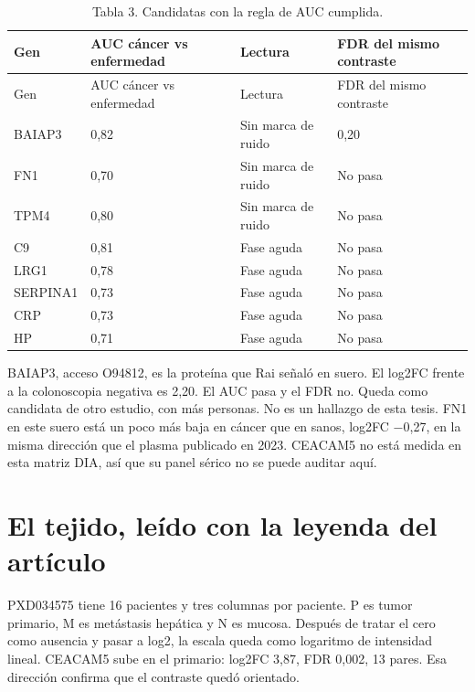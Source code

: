 \documentclass[12pt,oneside]{report}
\begin{document}
\begin{longtable}{p{3.88cm} p{3.88cm} p{3.88cm} p{3.88cm}}
\caption{Tabla 3. Candidatas con la regla de AUC cumplida.}\\
\toprule
Gen & AUC cáncer vs enfermedad & Lectura & FDR del mismo contraste\\
\midrule
\endfirsthead
\toprule
Gen & AUC cáncer vs enfermedad & Lectura & FDR del mismo contraste\\
\midrule
\endhead
BAIAP3 & 0,82 & Sin marca de ruido & 0,20\\
FN1 & 0,70 & Sin marca de ruido & No pasa\\
TPM4 & 0,80 & Sin marca de ruido & No pasa\\
C9 & 0,81 & Fase aguda & No pasa\\
LRG1 & 0,78 & Fase aguda & No pasa\\
SERPINA1 & 0,73 & Fase aguda & No pasa\\
CRP & 0,73 & Fase aguda & No pasa\\
HP & 0,71 & Fase aguda & No pasa\\
\bottomrule
\end{longtable}
BAIAP3, acceso O94812, es la proteína que Rai señaló en suero. El log2FC frente a la colonoscopia negativa es 2,20. El AUC pasa y el FDR no. Queda como candidata de otro estudio, con más personas. No es un hallazgo de esta tesis. FN1 en este suero está un poco más baja en cáncer que en sanos, log2FC −0,27, en la misma dirección que el plasma publicado en 2023. CEACAM5 no está medida en esta matriz DIA, así que su panel sérico no se puede auditar aquí.

\section{El tejido, leído con la leyenda del artículo}
PXD034575 tiene 16 pacientes y tres columnas por paciente. P es tumor primario, M es metástasis hepática y N es mucosa. Después de tratar el cero como ausencia y pasar a log2, la escala queda como logaritmo de intensidad lineal. CEACAM5 sube en el primario: log2FC 3,87, FDR 0,002, 13 pares. Esa dirección confirma que el contraste quedó orientado.
\end{document}
